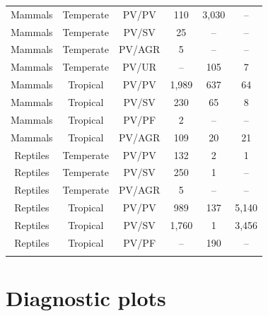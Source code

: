 \begin{table}[!htbp]
\begin{center}
\begin{tabular}{@{\extracolsep{5pt}} cccccc}
Mammals & Temperate & PV/PV & 110 & 3,030 & -- \\ 
Mammals & Temperate & PV/SV & 25 & -- & -- \\ 
Mammals & Temperate & PV/AGR & 5 & -- & -- \\ 
Mammals & Temperate & PV/UR & -- & 105 & 7 \\ 
Mammals & Tropical & PV/PV & 1,989 & 637 & 64 \\ 
Mammals & Tropical & PV/SV & 230 & 65 & 8 \\ 
Mammals & Tropical & PV/PF & 2 & -- & -- \\ 
Mammals & Tropical & PV/AGR & 109 & 20 & 21 \\ 
Reptiles & Temperate & PV/PV & 132 & 2 & 1 \\ 
Reptiles & Temperate & PV/SV & 250 & 1 & -- \\ 
Reptiles & Temperate & PV/AGR & 5 & -- & -- \\ 
Reptiles & Tropical & PV/PV & 989 & 137 & 5,140 \\ 
Reptiles & Tropical & PV/SV & 1,760 & 1 & 3,456 \\ 
Reptiles & Tropical & PV/PF & -- & 190 & -- \\ 
\hline \\[-1.8ex] 
\end{tabular}
\end{center} 
\end{table} 

\clearpage
\newpage

\section{Diagnostic plots}


